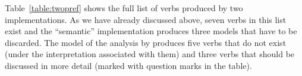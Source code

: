 % 

Table~\ref{table:twopref} shows the full list of verbs produced by two implementations. As we have already discussed above, seven verbs in this list exist and the ``semantic'' implementation produces three models that have to be discarded. The model of the analysis by \citet{Tatevosov:09} produces five verbs that do not exist (under the interpretation associated with them) and three verbs that should be discussed in more detail (marked with question marks in the table).

